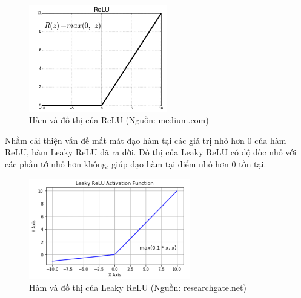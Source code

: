 {    \begin{figure}[H]
    \centering
    \includegraphics[width=6cm] {images/relu.png}
    \caption{Hàm và đồ thị của ReLU (Nguồn: medium.com)}
    \label{fig:conv_layer}
    \end{figure}

    Nhằm cải thiện vấn đề mất mát đạo hàm tại các giá trị nhỏ hơn 0 của hàm ReLU, hàm Leaky ReLU đã ra đời. Đồ thị của Leaky ReLU có độ dốc nhỏ với các phần tớ nhỏ hơn không, giúp đạo hàm tại điểm nhỏ hơn 0 tồn tại.
    
    \begin{figure}[H]
    \centering
    \includegraphics[width=7cm] {images/leaky.png}
    \caption{Hàm và đồ thị của Leaky ReLU (Nguồn: researchgate.net)}
    \label{fig:conv_layer}
    \end{figure}
    
}
